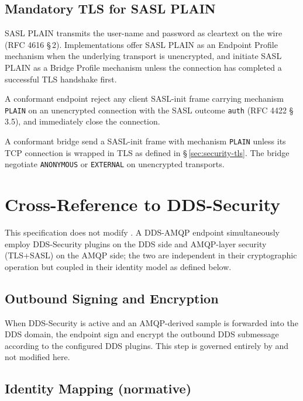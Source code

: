 \documentclass{../styles/zerodds-vendor-spec}
\begin{document}
\subsection{Mandatory TLS for SASL PLAIN}\label{sec:security-sasl-plain-tls}

SASL PLAIN transmits the user-name and password as cleartext on
the wire (RFC 4616 \S\,2). Implementations  offer
SASL PLAIN as an Endpoint Profile mechanism when the underlying
transport is unencrypted, and  initiate SASL
PLAIN as a Bridge Profile mechanism unless the connection has
completed a successful TLS handshake first.

A conformant endpoint  reject any client SASL-init
frame carrying mechanism \texttt{PLAIN} on an unencrypted
connection with the SASL outcome \texttt{auth} (RFC 4422
\S\,3.5), and  immediately close the connection.

A conformant bridge  send a SASL-init frame
with mechanism \texttt{PLAIN} unless its TCP connection is
wrapped in TLS as defined in \S\,\ref{sec:security-tls}. The
bridge  negotiate \texttt{ANONYMOUS} or
\texttt{EXTERNAL} on unencrypted transports.

\section{Cross-Reference to DDS-Security}\label{sec:security-dds-security}

This specification does not modify
. A DDS-AMQP endpoint
 simultaneously employ DDS-Security plugins on the DDS
side and AMQP-layer security (TLS+SASL) on the AMQP side; the two
are independent in their cryptographic operation but coupled in
their identity model as defined below.

\subsection{Outbound Signing and Encryption}

When DDS-Security is active and an AMQP-derived sample is forwarded
into the DDS domain, the endpoint  sign and encrypt
the outbound DDS submessage according to the configured DDS
plugins. This step is governed entirely by
 and not modified here.

\subsection{Identity Mapping (normative)}\label{sec:security-identity-mapping}
\end{document}

